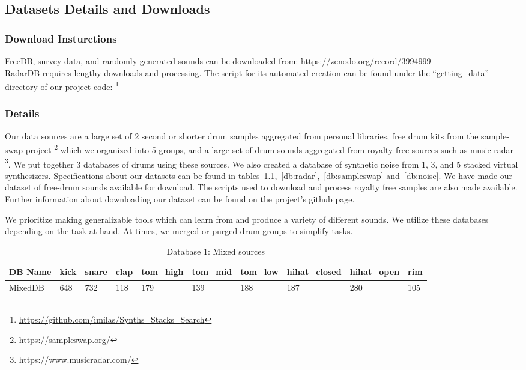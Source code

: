 \documentclass[runningheads,a4paper]{llncs}
\begin{document}
\begin{appendices}
\chapter{Datasets Details and Downloads}
\label{appendix:datasets}
\subsection{Download Insturctions}
FreeDB, survey data, and randomly generated sounds can be downloaded from: \url{https://zenodo.org/record/3994999}\\
RadarDB requires lengthy downloads and processing. The script for its automated creation can be found under the \enquote{getting\_data} directory of our project code: \footnote{\url{https://github.com/imilas/Synths_Stacks_Search}}
\subsection{Details}
Our data sources are a large set of 2 second or shorter drum samples aggregated from personal libraries, free drum kits from the sample-swap project \footnote{https://sampleswap.org/} which we organized into 5 groups, and a large set of drum sounds aggregated from royalty free sources such as music radar \footnote{https://www.musicradar.com/}. We put together 3 databases of drums using these sources. We also created a database of synthetic noise from 1, 3, and 5 stacked virtual synthesizers. Specifications about our datasets can be found in tables~\ref{db:self},~\ref{db:radar},~\ref{db:sampleswap} and~\ref{db:noise}. We have made our dataset of free-drum sounds available for download. The scripts used to download and process royalty free samples are also made available. Further information about downloading our dataset can be found on the project's github page. 

We prioritize making generalizable tools which can learn from and produce a variety of different sounds. We utilize these databases depending on the task at hand. At times, we merged or purged drum groups to simplify tasks.
\begin{table}[]
\centering
\begin{tabular}[width=\paperwidth]{|l|l|l|l|l|l|l|l|l|l|}
\hline
DB Name & kick & snare & clap & tom\_high & tom\_mid & tom\_low & hihat\_closed &  hihat\_open & rim \\ \hline
MixedDB & 648 & 732 & 118 & 179 & 139 &  188 & 187 & 280 & 105 \\\hline
\end{tabular}
\caption{Database 1: Mixed sources}
\label{db:self}
\end{table}


\end{appendices}
\end{document}
